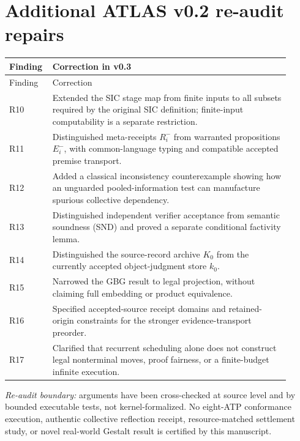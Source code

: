 \documentclass[10pt,letterpaper]{article}
\theoremstyle{remark}\newtheorem{remark}[definition]{Remark}
\begin{document}
\section*{Additional ATLAS v0.2 re-audit repairs}
\begin{longtable}{@{}p{0.11\linewidth}p{0.80\linewidth}@{}}
\toprule Finding & Correction in v0.3\\\midrule\endfirsthead
\toprule Finding & Correction\\\midrule\endhead
R10 & Extended the SIC stage map from finite inputs to all subsets required by the original SIC definition; finite-input computability is a separate restriction.\\
R11 & Distinguished meta-receipts $R_i^-$ from warranted propositions $E_i^-$, with common-language typing and compatible accepted premise transport.\\
R12 & Added a classical inconsistency counterexample showing how an unguarded pooled-information test can manufacture spurious collective dependency.\\
R13 & Distinguished independent verifier acceptance from semantic soundness (SND) and proved a separate conditional factivity lemma.\\
R14 & Distinguished the source-record archive $K_0$ from the currently accepted object-judgment store $k_0$.\\
R15 & Narrowed the GBG result to legal projection, without claiming full embedding or product equivalence.\\
R16 & Specified accepted-source receipt domains and retained-origin constraints for the stronger evidence-transport preorder.\\
R17 & Clarified that recurrent scheduling alone does not construct legal nonterminal moves, proof fairness, or a finite-budget infinite execution.\\
\bottomrule
\end{longtable}
\noindent\emph{Re-audit boundary:} arguments have been cross-checked at source level and by bounded executable tests, not kernel-formalized. No eight-ATP conformance execution, authentic collective reflection receipt, resource-matched settlement study, or novel real-world Gestalt result is certified by this manuscript.
\end{document}
